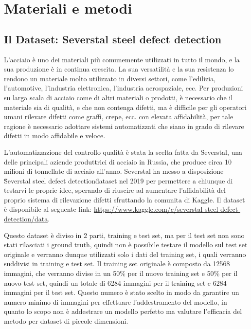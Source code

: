 \chapter{Materiali e metodi\ok \ok \ok}

\section{Il Dataset: Severstal steel defect detection \ok}

L'acciaio è uno dei materiali più comunemente utilizzati in tutto il mondo, e la sua produzione è in continua crescita.
La sua versatilità e la sua resistenza lo rendono un materiale molto utilizzato in diversi settori, come l'edilizia, l'automotive, l'industria elettronica, l'industria aerospaziale, ecc.
Per produzioni su larga scala di acciaio come di altri materiali o prodotti, è necessario che il materiale sia di qualità, e che non contenga difetti,
ma è difficile per gli operatori umani rilevare difetti come graffi, crepe, ecc. con elevata affidabilità, per tale ragione 
è necessario adottare sistemi automatizzati che siano in grado di rilevare difetti in modo affidabile e veloce.

L'automatizzazione del controllo qualità è stata la scelta fatta da Severstal, una delle principali aziende produttrici di acciaio in Russia, che produce circa 10 milioni di tonnellate di acciaio 
all'anno. Severstal ha messo a disposizione \"Severstal steel defect detection\" dataset nel 2019 per permettere a chiunque di testarvi le proprie idee, 
sperando di riuscire ad aumentare l'affidabilità del proprio sistema di rilevazione difetti sfruttando la comunita di Kaggle.
Il dataset è disponibile al seguente link: \url{https://www.kaggle.com/c/severstal-steel-defect-detection/data}.

Questo dataset è diviso in 2 parti, training e test set, ma per il test set non sono stati rilasciati i ground truth, quindi non è possibile testare
il modello sul test set originale e verranno dunque utilizzati solo i dati del training set, i quali verranno suddivisi in training e test set.
Il training set originale  è composto da 12568 immagini, che verranno divise in un 50\% per il nuovo training set e 50\% per il nuovo test set, 
quindi un totale di 6284 immagini per il training set e 6284 immagini per il test set. 
Questo numero è stato scelto in modo da garantire un numero minimo di immagini per effettuare l'addestramento del modello, in quanto 
lo scopo non è addestrare un modello perfetto ma valutare l'efficacia del metodo per dataset di piccole dimensioni. 

